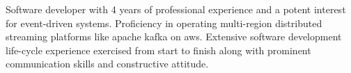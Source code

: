 \begin{cvletter}


Software developer with 4 years of professional experience and a potent interest for event-driven systems. Proficiency in operating multi-region distributed streaming platforms like apache kafka on aws. Extensive software development life-cycle experience exercised from start to finish along with prominent communication skills and constructive attitude. %


\end{cvletter}